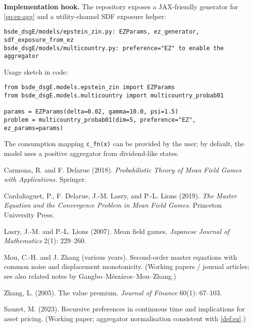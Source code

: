 \documentclass[11pt,letterpaper,oneside]{article}
\numberwithin{equation}{section}
\newcommand{\1}{\mathbf{1}}
\begin{document}
\begin{tcolorbox}[didacticstyle]
\textbf{Implementation hook.} The repository exposes a JAX-friendly generator
for \eqref{eq:ez-agg} and a utility-channel SDF exposure helper:
\begin{verbatim}
bsde_dsgE/models/epstein_zin.py: EZParams, ez_generator, sdf_exposure_from_ez
bsde_dsgE/models/multicountry.py: preference="EZ" to enable the aggregator
\end{verbatim}
Usage sketch in code:
\begin{verbatim}
from bsde_dsgE.models.epstein_zin import EZParams
from bsde_dsgE.models.multicountry import multicountry_probab01

params = EZParams(delta=0.02, gamma=10.0, psi=1.5)
problem = multicountry_probab01(dim=5, preference="EZ", ez_params=params)
\end{verbatim}
The consumption mapping \verb|c_fn(x)| can be provided by the user; by default,
the model uses a positive aggregator from dividend-like states.
\end{tcolorbox}

\begin{thebibliography}{99}\small

 Carmona, R. and F. Delarue (2018).
\emph{Probabilistic Theory of Mean Field Games with Applications.}
Springer.

 Cardaliaguet, P., F. Delarue, J.-M. Lasry, and P.-L. Lions (2019).
\emph{The Master Equation and the Convergence Problem in Mean Field Games.}
Princeton University Press.

 Lasry, J.-M. and P.-L. Lions (2007).
Mean field games.
\emph{Japanese Journal of Mathematics} 2(1): 229--260.

 Mou, C.-H. and J. Zhang (various years).
Second-order master equations with common noise and displacement monotonicity.
(Working papers / journal articles; see also related notes by Gangbo--Mészáros--Mou--Zhang.)

 Zhang, L. (2005).
The value premium.
\emph{Journal of Finance} 60(1): 67--103.

 Sauzet, M. (2023).
Recursive preferences in continuous time and implications for asset pricing.
(Working paper; aggregator normalisation consistent with \cref{def:ez}.)

\end{thebibliography}
\end{document}
